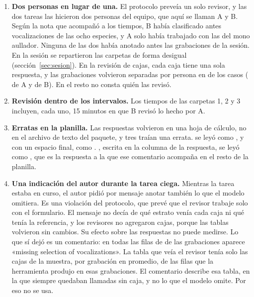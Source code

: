 \begin{enumerate}
    \item \textbf{Dos personas en lugar de una.} El protocolo preveía un solo
          revisor, y las dos tareas las hicieron dos personas del equipo, que aquí se
          llaman A y B. Según la nota que acompañó a los tiempos, B había clasificado
          antes vocalizaciones de las ocho especies, y A solo había trabajado con las
          del mono aullador. Ninguna de las dos había anotado antes las
          grabaciones de la sesión. En la sesión se repartieron las carpetas de forma desigual
          (sección~\ref{sec:sesion}). En la revisión de cajas, cada caja tiene una
          sola respuesta, y las grabaciones volvieron separadas por persona en
          \uPersonRecordings{} de los \uItemsRecordings{} casos (\uPersonRecA{} de A
          y \uPersonRecB{} de B). En el resto no consta quién las revisó.
    \item \textbf{Revisión dentro de los intervalos.} Los tiempos de las carpetas
          1, 2 y 3 incluyen, cada uno, 15 minutos en que B revisó lo hecho por A.
    \item \textbf{Erratas en la planilla.} Las respuestas volvieron en una hoja de
          cálculo, no en el archivo de texto del paquete, y tres traían una errata.
           se leyó como , y  con un espacio
          final, como . , escrita en la columna de la
          respuesta, se leyó como , que es la respuesta a la que ese
          comentario acompaña en el resto de la planilla.
    \item \textbf{Una indicación del autor durante la tarea ciega.} Mientras
          la tarea estaba en curso, el autor pidió por mensaje anotar también lo
          que el modelo omitiera. Es una violación del protocolo, que prevé que el
          revisor trabaje solo con el formulario. El mensaje no decía de qué
          estrato venía cada caja ni qué tenía la referencia, y los revisores no
          agregaron cajas, porque las tablas volvieron sin cambios. Su efecto sobre
          las respuestas no puede medirse. Lo que sí dejó es un comentario: en
          todas las filas de \uRefrainRecordings{} de las \uItemsRecordings{}
          grabaciones aparece «missing selection of vocalizations». La tabla que veía
          el revisor tenía solo las cajas de la muestra, \uShownPerRecording{} por
          grabación en promedio, de las \uRowsPerSampledRecording{} filas que la
          herramienta produjo en esas grabaciones. El comentario describe esa tabla,
          en la que siempre quedaban llamadas sin caja, y no lo que el modelo
          omite. Por eso no se usa.
\end{enumerate}

